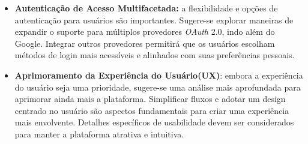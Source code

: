       \begin{itemize}
        \item \textbf{Autenticação de Acesso Multifacetada:} a flexibilidade e opções de autenticação para usuários são importantes. Sugere-se explorar maneiras de expandir o suporte para múltiplos provedores \textit{OAuth} 2.0, indo além do Google. Integrar outros provedores permitirá que os usuários escolham métodos de login mais acessíveis e alinhados com suas preferências pessoais.
        
        \item \textbf{Aprimoramento da Experiência do Usuário(UX)}: embora a experiência do usuário seja uma prioridade, sugere-se uma análise mais aprofundada para aprimorar ainda mais a plataforma. Simplificar fluxos e adotar um design centrado no usuário são aspectos fundamentais para criar uma experiência mais envolvente. Detalhes específicos de usabilidade devem ser considerados para manter a plataforma atrativa e intuitiva.
    
      \end{itemize}
